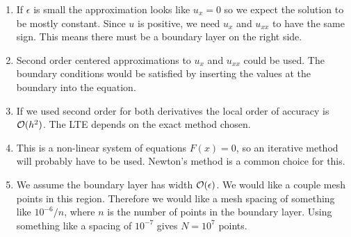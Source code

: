 \documentclass[10pt]{article}
\begin{document}
\begin{solution}[Solution]
\begin{enumerate}[label=(\alph*),nolistsep]
\item If \( \epsilon \) is small the approximation looks like \( u_x = 0 \) so we expect the solution to be mostly constant. Since \( u \) is positive, we need \( u_x \) and \( u_{xx} \) to have the same sign. This means there must be a boundary layer on the right side.

\item Second order centered approximations to \( u_x \) and \( u_{xx} \) could be used. The boundary conditions would be satisfied by inserting the values at the boundary into the equation.

\item If we used second order for both derivatives the local order of accuracy is \( \mathcal{O}(h^2) \). The LTE depends on the exact method chosen.

\item This is a non-linear system of equations \( F(x) = 0 \), so an iterative method will probably have to be used. Newton's method is a common choice for this.

\item We assume the boundary layer has width \( \mathcal{O}(\epsilon) \). We would like a couple mesh points in this region. Therefore we would like a mesh spacing of something like \( 10^{-6}/n \), where \( n \) is the number of points in the boundary layer. Using something like a spacing of \( 10^{-7} \) gives \( N = 10^7 \) points.

\end{enumerate}

\end{solution}
\end{document}
